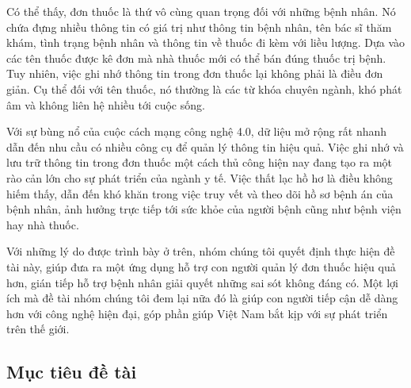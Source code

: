     Có thể thấy, đơn thuốc là thứ vô cùng quan trọng đối với những bệnh nhân. Nó chứa đựng nhiều thông tin có giá trị như thông tin bệnh nhân, tên bác sĩ thăm khám, tình trạng bệnh nhân và thông tin về thuốc đi kèm với liều lượng. Dựa vào các tên thuốc được kê đơn mà nhà thuốc mới có thể bán đúng thuốc trị bệnh. Tuy nhiên, việc ghi nhớ thông tin trong đơn thuốc lại không phải là điều đơn giản. Cụ thể đối với tên thuốc, nó thường là các từ khóa chuyên ngành, khó phát âm và không liên hệ nhiều tới cuộc sống.
    
    Với sự bùng nổ của cuộc cách mạng công nghệ 4.0, dữ liệu mở rộng rất nhanh dẫn đến nhu cầu có nhiều công cụ để quản lý thông tin hiệu quả. Việc ghi nhớ và lưu trữ thông tin trong đơn thuốc một cách thủ công hiện nay đang tạo ra một rào cản lớn cho sự phát triển của ngành y tế. Việc thất lạc hồ hơ là điều không hiếm thấy, dẫn đến khó khăn trong việc truy vết và theo dõi hồ sơ bệnh án của bệnh nhân, ảnh hưởng trực tiếp tới sức khỏe của người bệnh cũng như bệnh viện hay nhà thuốc.
    
    
    Với những lý do được trình bày ở trên, nhóm chúng tôi quyết định  thực hiện đề tài này, giúp đưa ra một ứng dụng hỗ trợ con người quản lý đơn thuốc hiệu quả hơn, gián tiếp hỗ trợ bệnh nhân giải quyết những sai sót không đáng có. Một lợi ích mà đề tài nhóm chúng tôi đem lại nữa đó là giúp con người tiếp cận dễ dàng hơn với công nghệ hiện đại, góp phần giúp Việt Nam bắt kịp với sự phát triển trên thế giới.

\subsection*{Mục tiêu đề tài}

